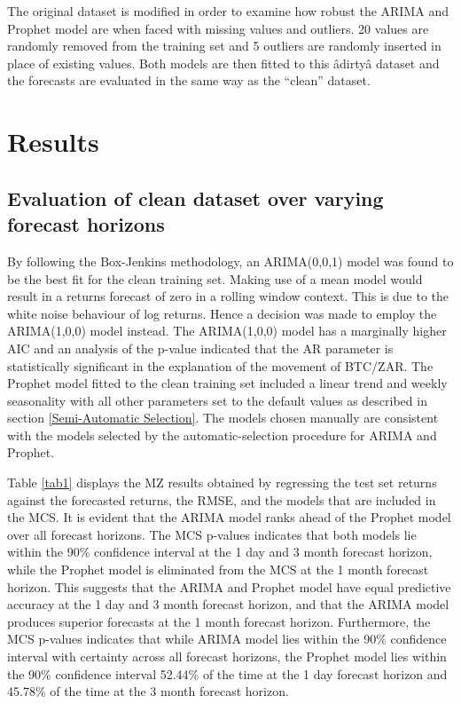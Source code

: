 \documentclass[12pt,a4paper]{article}
\numberwithin{equation}{section}
\numberwithin{figure}{section}
\numberwithin{table}{section}
\begin{document}
The original dataset is modified in order to examine how robust the
ARIMA and Prophet model are when faced with missing values and outliers.
20 values are randomly removed from the training set and 5 outliers are
randomly inserted in place of existing values. Both models are then
fitted to this âdirtyâ dataset and the forecasts are evaluated in
the same way as the ``clean'' dataset.

\section{\texorpdfstring{Results
\label{Results}}{Results }}\label{results}

\subsection{Evaluation of clean dataset over varying forecast
horizons}\label{evaluation-of-clean-dataset-over-varying-forecast-horizons}

By following the Box-Jenkins methodology, an ARIMA(0,0,1) model was
found to be the best fit for the clean training set. Making use of a
mean model would result in a returns forecast of zero in a rolling
window context. This is due to the white noise behaviour of log returns.
Hence a decision was made to employ the ARIMA(1,0,0) model instead. The
ARIMA(1,0,0) model has a marginally higher AIC and an analysis of the
p-value indicated that the AR parameter is statistically significant in
the explanation of the movement of BTC/ZAR. The Prophet model fitted to
the clean training set included a linear trend and weekly seasonality
with all other parameters set to the default values as described in
section \ref{Semi-Automatic Selection}. The models chosen manually are
consistent with the models selected by the automatic-selection procedure
for ARIMA and Prophet.

Table \ref{tab1} displays the MZ results obtained by regressing the test
set returns against the forecasted returns, the RMSE, and the models
that are included in the MCS. It is evident that the ARIMA model ranks
ahead of the Prophet model over all forecast horizons. The MCS p-values
indicates that both models lie within the 90\% confidence interval at
the 1 day and 3 month forecast horizon, while the Prophet model is
eliminated from the MCS at the 1 month forecast horizon. This suggests
that the ARIMA and Prophet model have equal predictive accuracy at the 1
day and 3 month forecast horizon, and that the ARIMA model produces
superior forecasts at the 1 month forecast horizon. Furthermore, the MCS
p-values indicates that while ARIMA model lies within the 90\%
confidence interval with certainty across all forecast horizons, the
Prophet model lies within the 90\% confidence interval 52.44\% of the
time at the 1 day forecast horizon and 45.78\% of the time at the 3
month forecast horizon.
\end{document}
